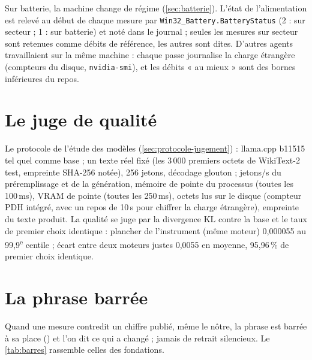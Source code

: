 Sur batterie, la machine change de régime (\cref{sec:batterie}). L'état de l'alimentation est relevé au début de chaque mesure par \texttt{Win32\_Battery.BatteryStatus} (2 : sur secteur ; 1 : sur batterie) et noté dans le journal ; seules les mesures sur secteur sont retenues comme débits de référence, les autres sont dites. D'autres agents travaillaient sur la même machine : chaque passe journalise la charge étrangère (compteurs du disque, \texttt{nvidia-smi}), et les débits « au mieux » sont des bornes inférieures du repos.

\section{Le juge de qualité}\label{sec:protocole-qualite}

Le protocole de l'étude des modèles (\cref{sec:protocole-jugement}) : llama.cpp b11515 tel quel comme base ; un texte réel fixé (les 3\,000 premiers octets de WikiText-2 test, empreinte SHA-256 notée), 256 jetons, décodage glouton ; jetons/s du préremplissage et de la génération, mémoire de pointe du processus (toutes les 100\,ms), VRAM de pointe (toutes les 250\,ms), octets lus sur le disque (compteur PDH intégré, avec un repos de 10\,s pour chiffrer la charge étrangère), empreinte du texte produit. La qualité se juge par la divergence KL contre la base et le taux de premier choix identique : plancher de l'instrument (même moteur) 0,000055 au 99,9\textsuperscript{e} centile ; écart entre deux moteurs justes 0,0055 en moyenne, 95,96\,\% de premier choix identique.

\section{La phrase barrée}

Quand une mesure contredit un chiffre publié, même le nôtre, la phrase est barrée à sa place () et l'on dit ce qui a changé ; jamais de retrait silencieux. Le \cref{tab:barres} rassemble celles des fondations.
